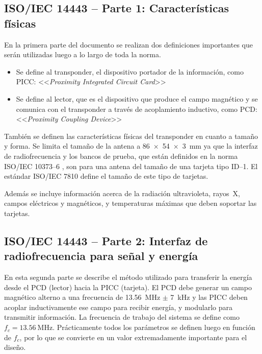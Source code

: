 
\subsection{ISO/IEC 14443 -- Parte 1: Características físicas}

En la primera parte del documento se realizan dos definiciones importantes 
que serán utilizadas luego a lo largo de toda la norma.

\begin{itemize}
	\item{Se define al transponder, el dispositivo portador de la 
	información, como PICC: <<\emph{Proximity Integrated Circuit Card}>>}
	
	\item{Se define al lector, que es el dispositivo que produce el campo 
	magnético y se comunica con el transponder a través de acoplamiento 
	inductivo, como PCD: <<\emph{Proximity Coupling Device}>>}
\end{itemize}

También se definen las características físicas del transponder en cuanto a 
tamaño y forma. Se limita el tamaño de la antena a \SI[product-units = 
brackets]{86 x 54 x 3}{\milli\meter} ya que la interfaz de radiofrecuencia y 
los bancos de prueba, que están definidos en la norma ISO/IEC 10373--6 \cite
{ISO10373Part6}, son para una antena del tamaño de una tarjeta tipo ID--1. 
El estándar ISO/IEC 7810 define el tamaño de este tipo de tarjetas.

Además se incluye información acerca de la radiación ultravioleta, rayos~X, 
campos eléctricos y magnéticos, y temperaturas máximas que deben soportar 
las tarjetas.

\subsection{ISO/IEC 14443 -- Parte 2: Interfaz de radiofrecuencia para señal 
y energía}
\label{sec:ISO14443_2}

En esta segunda parte se describe el método utilizado para transferir la 
energía desde el PCD (lector) hacia la PICC (tarjeta). El PCD debe generar 
un campo magnético alterno a una frecuencia de \SI{13.56}{\mega\hertz} \(\pm
\) \SI{7}{\kilo\hertz} y las PICC deben acoplar inductivamente ese campo 
para recibir energía, y modularlo para transmitir información. La frecuencia 
de trabajo del sistema se define como \(f_c = \SI{13.56}{\mega\hertz}\). 
Prácticamente todos los parámetros se definen luego en función de \(f_c\), 
por lo que se convierte en un valor extremadamente importante para el diseño.

